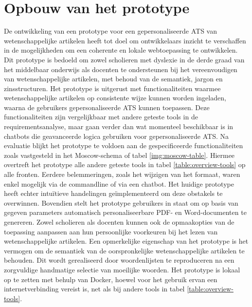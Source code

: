 \section{Opbouw van het prototype}


De ontwikkeling van een prototype voor een gepersonaliseerde ATS van wetenschappelijke artikelen heeft tot doel om ontwikkelaars inzicht te verschaffen in de mogelijkheden om een coherente en lokale webtoepassing te ontwikkelen. Dit prototype is bedoeld om zowel scholieren met dyslexie in de derde graad van het middelbaar onderwijs als docenten te ondersteunen bij het vereenvoudigen van wetenschappelijke artikelen, met behoud van de semantiek, jargon en zinsstructuren. Het prototype is uitgerust met functionaliteiten waarmee wetenschappelijke artikelen op consistente wijze kunnen worden ingeladen, waarna de gebruikers gepersonaliseerde ATS kunnen toepassen. Deze functionaliteiten zijn vergelijkbaar met andere geteste tools in de requirementsanalyse, maar gaan verder dan wat momenteel beschikbaar is in chatbots die geavanceerde logica gebruiken voor gepersonaliseerde ATS. Na evaluatie blijkt het prototype te voldoen aan de gespecificeerde functionaliteiten zoals vastgesteld in het Moscow-schema of tabel \ref{img:moscow-table}. Hiermee overtreft het prototype alle andere geteste tools in tabel \ref{table:overview-tools} op alle fronten. Eerdere belemmeringen, zoals het wijzigen van het formaat, waren enkel mogelijk via de commandline of via een chatbot. Het huidige prototype heeft echter intuïtieve handelingen geïmplementeerd om deze obstakels te overwinnen. Bovendien stelt het prototype gebruikers in staat om op basis van gegeven parameters automatisch personaliseerbare PDF- en Word-documenten te genereren. Zowel scholieren als docenten kunnen ook de opmaakopties van de toepassing aanpassen aan hun persoonlijke voorkeuren bij het lezen van wetenschappelijke artikelen. Een opmerkelijke eigenschap van het prototype is het vermogen om de semantiek van de oorspronkelijke wetenschappelijke artikelen te behouden. Dit wordt gerealiseerd door woordenlijsten te reproduceren na een zorgvuldige handmatige selectie van moeilijke woorden. Het prototype is lokaal op te zetten met behulp van Docker, hoewel voor het gebruik ervan een internetverbinding vereist is, net als bij andere tools in tabel \ref{table:overview-tools}.
